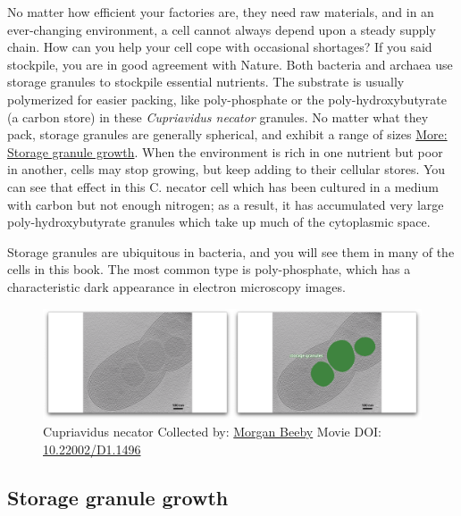 \documentclass[]{tufte-book}
\begin{document}
No matter how efficient your factories are, they need raw materials, and
in an ever-changing environment, a cell cannot always depend upon a
steady supply chain. How can you help your cell cope with occasional
shortages? If you said stockpile, you are in good agreement with Nature.
Both bacteria and archaea use storage granules to stockpile essential
nutrients. The substrate is usually polymerized for easier packing, like
poly-phosphate or the poly-hydroxybutyrate (a carbon store) in these
\emph{Cupriavidus necator} granules. No matter what they pack, storage
granules are generally spherical, and exhibit a range of sizes
\protect\hyperlink{Storage_granule_growth}{More: Storage granule
growth}. When the environment is rich in one nutrient but poor in
another, cells may stop growing, but keep adding to their cellular
stores. You can see that effect in this C. necator cell which has been
cultured in a medium with carbon but not enough nitrogen; as a result,
it has accumulated very large poly-hydroxybutyrate granules which take
up much of the cytoplasmic space.

Storage granules are ubiquitous in bacteria, and you will see them in
many of the cells in this book. The most common type is poly-phosphate,
which has a characteristic dark appearance in electron microscopy
images.





\begin{figure}
\includegraphics{movie_stills/4_8} \caption[Cupriavidus necator Collected by:
\protect\hyperlink{morgan_beeby}{Morgan Beeby} Movie DOI:
\href{https://doi.org/10.22002/D1.1496}{10.22002/D1.1496}]{Cupriavidus necator Collected by:
\protect\hyperlink{morgan_beeby}{Morgan Beeby} Movie DOI:
\href{https://doi.org/10.22002/D1.1496}{10.22002/D1.1496}}\label{fig:4-8}
\end{figure}

\hypertarget{Storage_granule_growth}{\subsection{Storage granule
growth}\label{Storage_granule_growth}}
\end{document}
